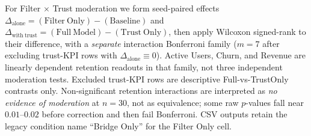 For Filter $\times$ Trust moderation we form seed-paired effects $\Delta_{\mathrm{alone}}=(\mathrm{Filter\ Only})-(\mathrm{Baseline})$ and $\Delta_{\mathrm{with\ trust}}=(\mathrm{Full\ Model})-(\mathrm{Trust\ Only})$, then apply Wilcoxon signed-rank to their difference, with a \emph{separate} interaction Bonferroni family ($m=7$ after excluding trust-KPI rows with $\Delta_{\mathrm{alone}}\equiv 0$). Active Users, Churn, and Revenue are linearly dependent retention readouts in that family, not three independent moderation tests. Excluded trust-KPI rows are descriptive Full-vs-TrustOnly contrasts only. Non-significant retention interactions are interpreted as \emph{no evidence of moderation} at $n=30$, not as equivalence; some raw $p$-values fall near $0.01$--$0.02$ before correction and then fail Bonferroni. CSV outputs retain the legacy condition name ``Bridge Only'' for the Filter Only cell.
